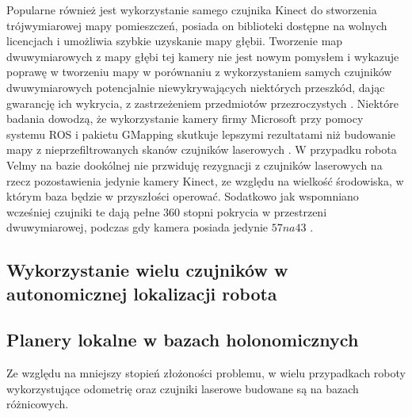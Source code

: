 	Popularne również jest wykorzystanie samego czujnika Kinect do stworzenia trójwymiarowej mapy pomieszczeń, posiada on biblioteki dostępne na wolnych licencjach i umożliwia szybkie uzyskanie mapy głębii.
	Tworzenie map dwuwymiarowych z mapy głębi tej kamery nie jest nowym pomysłem i wykazuje poprawę w tworzeniu mapy w porównaniu z wykorzystaniem samych czujników dwuwymiarowych potencjalnie niewykrywających niektórych przeszkód, dając gwarancję ich wykrycia, z zastrzeżeniem przedmiotów przezroczystych \cite{kamarudin2013method}.
	Niektóre badania dowodzą, że wykorzystanie kamery firmy Microsoft przy pomocy systemu ROS i pakietu GMapping skutkuje lepszymi rezultatami niż budowanie mapy z nieprzefiltrowanych skanów czujników laserowych \cite{omara2015indoor}.
	W przypadku robota Velmy na bazie dookólnej nie przwiduję rezygnacji z czujników laserowych na rzecz pozostawienia jedynie kamery Kinect, ze względu na wielkość środowiska, w którym baza będzie w przyszłości operować.
	Sodatkowo jak wspomniano wcześniej czujniki te dają pełne $360$ stopni pokrycia w przestrzeni dwuwymiarowej, podczas gdy kamera posiada jedynie $57 na43$ \cite{kinect_fov}. 
	
\subsection{Wykorzystanie wielu czujników w autonomicznej lokalizacji robota}
	
\subsection{Planery lokalne w bazach holonomicznych}
	Ze względu na mniejszy stopień złożoności problemu, w wielu przypadkach roboty wykorzystujące odometrię oraz czujniki laserowe budowane są na bazach różnicowych. 



